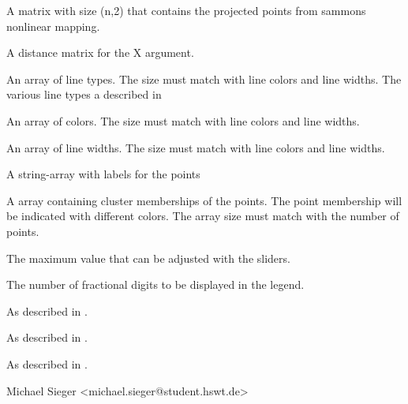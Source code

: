 \documentclass[letterpaper]{book}
\begin{document}
\begin{Arguments}
\begin{ldescription}
\item[\code{X}] 
A matrix with size (n,2) that contains the projected points from sammons nonlinear mapping.

\item[\code{D}] 
A distance matrix for the X argument. 

\item[\code{linetypes}] 
An array of line types. The size must match with line colors and line widths.
The various line types a described in 

\item[\code{linecolors}] 
An array of colors. The size must match with line colors and line widths.

\item[\code{linewidths}] 
An array of line widths. The size must match with line colors and line widths.

\item[\code{labels}] 
A string-array with labels for the points

\item[\code{cluster}] 
A array containing cluster memberships of the points. The point
membership will be indicated with different colors. The array size
must match with the number of points.

\item[\code{maxValue}] 
The maximum value that can be adjusted with the sliders.

\item[\code{legendDigits}] 
The number of fractional digits to be displayed in the legend.

\item[\code{xlab}] 
As described in .

\item[\code{ylab}] 
As described in .

\item[\code{main}] 
As described in .

\end{ldescription}
\end{Arguments}
%
\begin{Author}\relax
Michael Sieger <michael.sieger@student.hswt.de>
\end{Author}
%
\end{document}
